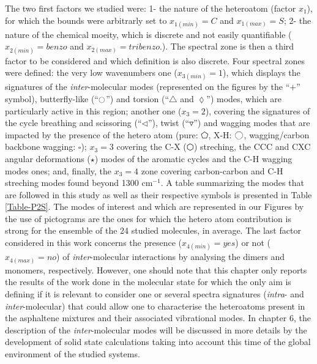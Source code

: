 	The two first factors we studied were: 1- the nature of the heteroatom (factor $x_1$), for which the bounds were arbitrarly set to $x_{1(min)}=C$ and $x_{1(max)}=S$; 2- the nature of the chemical moeity, which is discrete and not easily quantifiable ($x_{2(min)}=benzo$ and $x_{2(max)}=tribenzo$.). The spectral zone is then a third factor to be considered and which definition is also discrete. 
	Four spectral zones were defined: the very low wavenumbers one ($x_{3(min)}=1$), which displays the signatures of the \textit{inter}-molecular modes (represented on the figures by the “$ + $” symbol), butterfly-like (“$\ocircle$”) and torsion (“$\triangle$ and $\lozenge$”) modes, which are particularly active in this region; another one ($x_3=2$), covering the signatures of the cycle breathing and scissoring (“$\lhd$”), twist (“$\triangledown$”) and wagging modes that are impacted by the presence of the hetero atom (pure: $\pentagon$, X-H: $\octagon$, wagging/carbon backbone wagging: $\square$); $x_3=3$ covering the C-X ($\varhexagon$) streching, the CCC and CXC angular deformations ($\star$) modes of the aromatic cycles and the C-H wagging modes ones; and, finally, the $x_3=4$ zone covering carbon-carbon and C-H streching modes found beyond 1300 cm$^{-1}$.  A table summarizing the modes that are followed in this study as well as their respective symbols is presented in Table \ref{Table-P2S}. The modes of interest and which are represented in our Figures by the use of pictograms are the ones for which the hetero atom contribution is strong for the ensemble of the 24 studied molecules, in average. The last factor considered in this work concerns the presence ($x_{4(min)}=yes$) or not ($x_{4(max)}=no$) of \textit{inter}-molecular interactions by analysing the dimers and monomers, respectively. However, one should note that this chapter only reports the results of the work done in the molecular state for which the only aim is defining if it is relevant to consider one or several spectra signatures (\textit{intra}- and \textit{inter}-molecular) that could allow one to characterise the heteroatoms present in the asphaltene mixtures and their associated vibrational modes. In chapter 6, the description of the \textit{inter}-molecular modes will be discussed in more details by the development of solid state calculations taking into account this time of the global environment of the studied systems.\\
	
